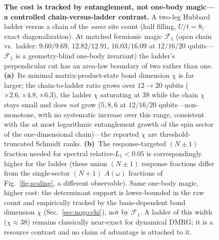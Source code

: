 \begin{figure}[tp]\centering
\caption{\textbf{The cost is tracked by entanglement, not one-body magic---a controlled chain-versus-ladder
contrast.} A two-leg Hubbard ladder versus a chain of the \emph{same} site count (half filling,
$U/t=8$; exact diagonalization). At matched fermionic magic $\mathcal F_1$ (open chain vs.\ ladder: $9.60/9.69$,
$12.82/12.91$, $16.03/16.09$ at $12/16/20$ qubits---$\mathcal F_1$ is a geometry-blind one-body invariant)
the ladder's perpendicular cut has an area-law boundary of two rather than one. \textbf{(a)}~Its minimal
matrix-product-state bond dimension $\chi$ is far larger; the chain-to-ladder ratio grows over
$12\to20$ qubits ($\times2.6,\times4.8,\times6.3$), the ladder $\chi$ saturating at $38$ while the chain
$\chi$ stays small and does \emph{not} grow ($5,8,6$ at $12/16/20$ qubits---non-monotone, with no systematic
increase over this range, consistent with the at most logarithmic entanglement growth of the spin
sector of the one-dimensional chain)---the reported $\chi$ are threshold-truncated Schmidt ranks. \textbf{(b)}~The response-targeted $(N{\pm}1)$ fraction needed for spectral
relative-$L_1<0.05$ is correspondingly higher for the ladder (these union $(N{\pm}1)$ response fractions
differ from the single-sector $(N{+}1)$ $A(\omega)$ fractions of Fig.~\ref{fig:scaling}, a different
observable). Same one-body magic, higher cost: the
determinant support is lower-bounded in the raw count and empirically tracked by the basis-dependent
bond dimension $\chi$ (Sec.~\ref{sec:nogo:chi}), not by $\mathcal F_1$. A ladder of this width
($\chi\!\approx\!38$) remains classically near-exact for dynamical DMRG; it is a resource contrast and
no claim of advantage is attached to it.}\label{fig:ladder}\end{figure}
